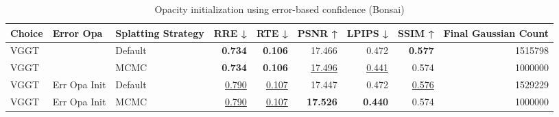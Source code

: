 \begin{table}[H]
\caption{Opacity initialization using error-based confidence (Bonsai)}
\label{tab:05_error_opa_bonsai}
\begin{tabular}{lllrrrrrr}
\toprule
Choice & Error Opa & Splatting Strategy & RRE ↓ & RTE ↓ & PSNR ↑ & LPIPS ↓ & SSIM ↑ & Final Gaussian Count \\
\midrule
VGGT &  & Default & \textbf{0.734} & \textbf{0.106} & 17.466 & 0.472 & \textbf{0.577} & 1515798 \\
VGGT &  & MCMC & \textbf{0.734} & \textbf{0.106} & \underline{17.496} & \underline{0.441} & 0.574 & 1000000 \\
VGGT & Err Opa Init & Default & \underline{0.790} & \underline{0.107} & 17.447 & 0.472 & \underline{0.576} & 1529229 \\
VGGT & Err Opa Init & MCMC & \underline{0.790} & \underline{0.107} & \textbf{17.526} & \textbf{0.440} & 0.574 & 1000000 \\
\bottomrule
\end{tabular}
\end{table}
